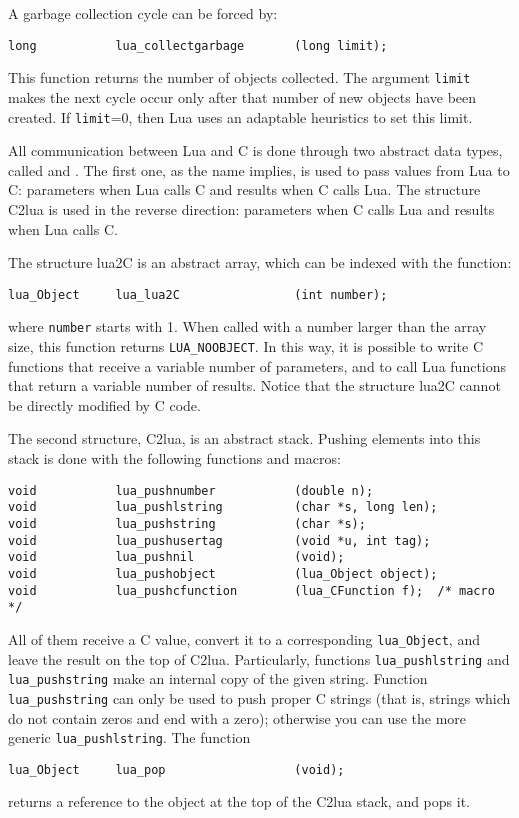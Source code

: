 A garbage collection cycle can be forced by:
\begin{verbatim}
long           lua_collectgarbage       (long limit);
\end{verbatim}
This function returns the number of objects collected.
The argument \verb|limit| makes the next cycle occur only
after that number of new objects have been created.
If \verb|limit|=0, then Lua uses an adaptable heuristics to set this limit.


All communication between Lua and C is done through two
abstract data types, called  and .
The first one, as the name implies, is used to pass values
from Lua to C:
parameters when Lua calls C and results when C calls Lua.
The structure C2lua is used in the reverse direction:
parameters when C calls Lua and results when Lua calls C.

The structure lua2C is an abstract array,
which can be indexed with the function:
\begin{verbatim}
lua_Object     lua_lua2C                (int number);
\end{verbatim}
where \verb|number| starts with 1.
When called with a number larger than the array size,
this function returns \verb|LUA_NOOBJECT|.
In this way, it is possible to write C functions that receive
a variable number of parameters,
and to call Lua functions that return a variable number of results.
Notice that the structure lua2C cannot be directly modified by C code.

The second structure, C2lua, is an abstract stack.
Pushing elements into this stack
is done with the following functions and macros:
\label{pushing}
\begin{verbatim}
void           lua_pushnumber           (double n);
void           lua_pushlstring          (char *s, long len);
void           lua_pushstring           (char *s);
void           lua_pushusertag          (void *u, int tag);
void           lua_pushnil              (void);
void           lua_pushobject           (lua_Object object);
void           lua_pushcfunction        (lua_CFunction f);  /* macro */
\end{verbatim}
All of them receive a C value,
convert it to a corresponding \verb|lua_Object|,
and leave the result on the top of C2lua.
Particularly, functions \verb|lua_pushlstring| and \verb|lua_pushstring|
make an internal copy of the given string.
Function \verb|lua_pushstring| can only be used to push proper C strings
(that is, strings which do not contain zeros and end with a zero);
otherwise you can use the more generic \verb|lua_pushlstring|.
The function
\begin{verbatim}
lua_Object     lua_pop                  (void);
\end{verbatim}
returns a reference to the object at the top of the C2lua stack,
and pops it.

